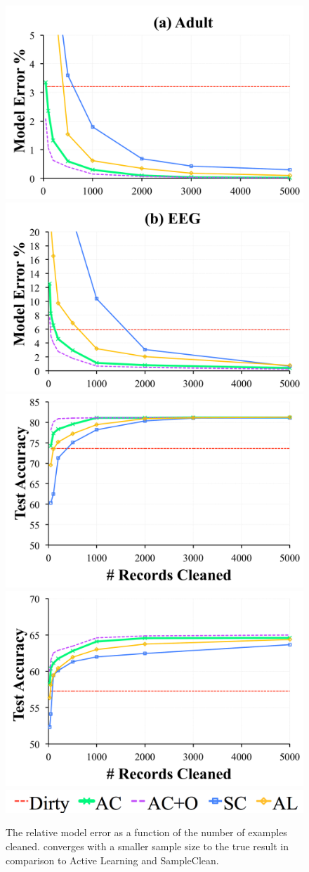 \begin{figure}[ht!]
\centering\vspace{-1em}
 \includegraphics[width=0.49\columnwidth]{exp/exp3b.pdf}
  \includegraphics[width=0.49\columnwidth]{exp/exp3c.pdf}
  \includegraphics[width=0.49\columnwidth]{exp/exp3bb.pdf}
  \includegraphics[width=0.49\columnwidth]{exp/exp3cc.pdf}
  \includegraphics[width=0.5\columnwidth]{exp/legend-general.png}\vspace{-0.5em}
 \caption{ The relative model error as a function of the number of examples cleaned. \sys converges with a smaller sample size to the true result in comparison to Active Learning and SampleClean. \label{prio-perf}}\vspace{-1em}
\end{figure}

